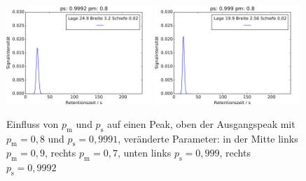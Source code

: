 \begin{figure}[H]
\includegraphics[width=0.49\textwidth]{bilder/2s_einzeleinfluss/2s_t20_psp}
\includegraphics[width=0.49\textwidth]{bilder/2s_einzeleinfluss/2s_t20_psm}
\caption[Einfluss von $p_{\text{m}}$ und $p_{\text{s}}$ auf einen Peak]{Einfluss von $p_{\text{m}}$ und $p_{\text{s}}$ auf einen Peak, oben der Ausgangspeak mit $p_{\text{m}} = 0,8$ und $p_{\text{s}} = 0,9991$, veränderte Parameter: in der Mitte links $p_{\text{m}} = 0,9$, rechts $p_{\text{m}} = 0,7$, unten links $p_{\text{s}} = 0,999$, rechts $p_{\text{s}} = 0,9992$ }
\label{2s_t20_change}
\end{figure}

